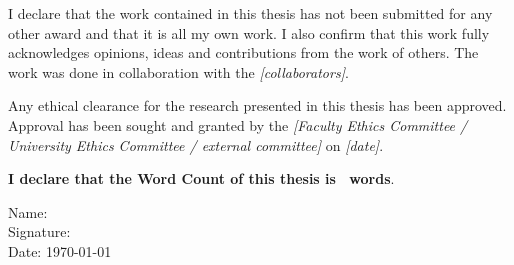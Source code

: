 \begin{frontmattersection}[Declaration]
I declare that the work contained in this thesis has not been submitted for any other award and that it is all my own work. I also confirm that this work fully acknowledges opinions, ideas and contributions from the work of others. The work was done in collaboration with the \emph{[collaborators]}.

Any ethical clearance for the research presented in this thesis has been approved. Approval has been sought and granted by the \emph{[Faculty Ethics Committee / University Ethics Committee / external committee]} on \emph{[date]}.\\[2cm]
\begin{center}
    \textbf{I declare that the Word Count of this thesis is \words~words}.\\[3cm]
\end{center}
Name: \name\\[2cm]
Signature:\\[2cm]
Date: \today

\end{frontmattersection}